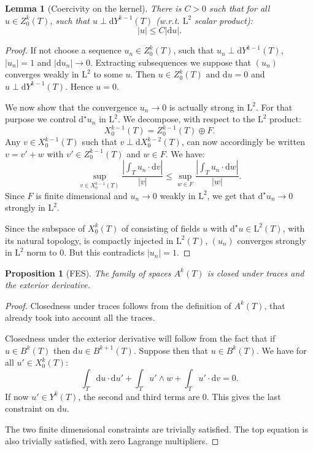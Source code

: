 \documentclass[10pt,a4paper]{article}
\newcommand{\rmd}{\mathrm{d}}
\newcommand{\rmL}{\mathrm{L}}
\newtheorem{lemma}[theorem]{Lemma}
\newtheorem{proposition}[theorem]{Proposition}
\theoremstyle{remark}
\theoremstyle{definition}
\numberwithin{equation}{section}
\begin{document}
\begin{lemma}[Coercivity on the kernel]\label{lem:coerker}
  There is $C>0$ such that for all $u \in Z^k_0(T)$, such that $u \perp \rmd Y^{k-1}(T)$ (w.r.t. $\rmL^2$ scalar product):
\begin{equation}
   |u| \leq C | \rmd u|.
\end{equation}
\end{lemma}
\begin{proof}
  If not choose a sequence $u_n \in Z^k_0(T)$, such that $u_n \perp \rmd Y^{k-1}(T)$, $|u_n| = 1$ and $|\rmd u_n| \to 0$. Extracting subsequences we suppose that $(u_n)$ converges weakly in $\rmL^2$ to some $u$. Then $u \in Z^k_0(T)$ and $\rmd u =0$ and $u \perp \rmd Y^{k-1}(T)$. Hence $u=0$.

  We now show that the convergence $u_n \to 0$ is actually strong in $\rmL^2$. For that purpose we control $\rmd^\star u_n$ in $\rmL^2$. We decompose, with respect to the $\rmL^2$ product:
  \begin{equation}
    X_0^{k-1}(T) = Z_0^{k-1}(T) \oplus F.
  \end{equation}
  Any $v\in X_0^{k-1}(T)$ such that $v \perp \rmd X^{k-2}_0(T)$, can now accordingly be written $v = v' + w$ with $v' \in Z^{k-1}_0(T)$ and $w \in F$. We have:
  \begin{equation}
   \sup_{v \in X_0^{k-1}(T)} \frac {|\int_T u_n \cdot \rmd v|}{| v|} \leq \sup_{w \in F} \frac{|\int_T u_n \cdot \rmd w|}{|w|}.
  \end{equation}
  Since $F$ is finite dimensional and $u_n\to 0$ weakly in $\rmL^2$, we get that $\rmd^\star u_n \to 0$ strongly in $\rmL^2$.

  Since the subspace of $X^k_0(T)$ of consisting of fields $u$ with $\rmd^\star u \in \rmL^2(T)$, with its natural topology, is compactly injected in $\rmL^2(T)$, $(u_n)$ converges strongly in $\rmL^2$ norm to $0$. But this contradicts $|u_n| = 1$.
  \end{proof}

\begin{proposition}[FES] The family of spaces $A^k(T)$ is closed under traces and the exterior derivative. 
\end{proposition}
\begin{proof}
  Closedness under traces follows from the definition of $A^k(T)$, that already took into account all the traces.

  Closedness under the exterior derivative will follow from the fact that if $u \in B^k(T)$ then $\rmd u \in B^{k+1}(T)$. Suppose then that $u \in B^k(T)$. We have for all $u' \in X^k_0(T)$:
  \begin{equation}
\int_T \rmd u \cdot \rmd u' + \int_T u' \wedge w + \int_T u' \cdot \rmd v = 0.
  \end{equation}
  If now $u'\in Y^k(T)$, the second and third terms are 0. This gives the last constraint on $\rmd u$.

The two finite dimensional constraints are trivially satisfied.
The top equation is also trivially satisfied, with zero Lagrange multipliers.
\end{proof}
\end{document}
